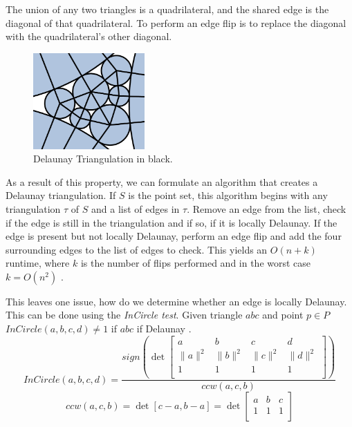 \documentclass[11pt]{article}
\theoremstyle{definition}
\begin{document}
	The union of any two triangles is a quadrilateral, and the shared edge is the diagonal of that quadrilateral. 
	To perform an edge flip is to replace the diagonal with the quadrilateral's other diagonal.

	\begin{figure}
  		\begin{center}
    		\includegraphics[width=0.38\textwidth]{delaunayemph}
  		\end{center}
  		\caption{Delaunay Triangulation in black.}
	\end{figure}
	As a result of this property, we can formulate an algorithm that creates a Delaunay triangulation. 
	If $S$ is the point set, this algorithm begins with any triangulation $\tau$ of $S$ and a list of edges in $\tau$. 
	Remove an edge from the list, check if the edge is still in the triangulation and if so, if it is locally Delaunay. 
	If the edge is present but not locally Delaunay, perform an edge flip and add the four surrounding edges to the list of edges to check. 
	This yields an $O(n + k)$ runtime, where $k$ is the number of flips performed and in the worst case $k = O(n^2)$ \cite{meshGeneration}.

	This leaves one issue, how do we determine whether an edge is locally Delaunay. 
	This can be done using the \emph{InCircle test}. 
	Given triangle $abc$ and point $p \in P$ $InCircle(a,b,c,d) \neq 1$ if $abc$ if Delaunay \cite{princeton:CCW}. 
	\begin{equation}
		InCircle(a,b,c,d) = \frac{sign(\det
		\begin{bmatrix}
    			a & b & c & d \\
    			\|a\|^2 & \|b\|^2 & \|c\|^2 & \|d\|^2 \\
    			1 & 1 & 1 & 1 \\
		\end{bmatrix} 
		)}{ccw(a,c,b)}
	\end{equation}
	\begin{equation}
		ccw(a,c,b) = \det[c-a,b-a] = \det
		\begin{bmatrix}
    			a & b & c \\
    			1 & 1 & 1\\
		\end{bmatrix} 
	\end{equation} 
	
\end{document}

